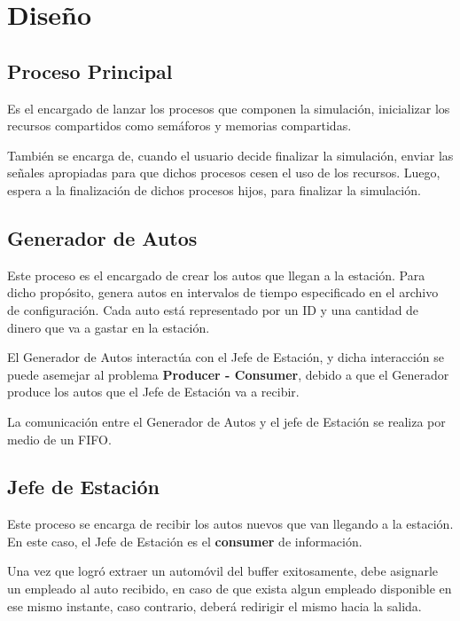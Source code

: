 \documentclass[12pt,a4paper,spanish]{article}
\begin{document}

\newpage
\tableofcontents
\newpage
\section{Diseño}
	\subsection{Proceso Principal}

		Es el encargado de lanzar los procesos que componen la simulación, inicializar los recursos
		compartidos como semáforos y memorias compartidas.

		También se encarga de, cuando el usuario decide finalizar la simulación, enviar las señales
		apropiadas para que dichos procesos cesen el uso de los recursos. Luego, espera a la finalización
		de dichos procesos hijos, para finalizar la simulación.

	\subsection{Generador de Autos}
		
		Este proceso es el encargado de crear los autos que llegan a la estación. Para
		dicho propósito, genera autos en intervalos de tiempo especificado en el archivo de configuración. 
		Cada auto está representado por un ID y una cantidad de dinero que va a gastar en la estación.

		El Generador de Autos interactúa con el Jefe de Estación, y dicha interacción se puede
		asemejar al problema \textbf{Producer - Consumer}, debido a que el Generador produce
		los autos que el Jefe de Estación va a recibir. 

		La comunicación entre el Generador de Autos y el jefe de Estación se realiza por medio de un
		FIFO.


	\subsection{Jefe de Estación}
		Este proceso se encarga de recibir los autos nuevos que van llegando a la estación. 
		En este caso, el Jefe de Estación es el \textbf{consumer} de información.

		Una vez que logró extraer un automóvil del buffer exitosamente, debe asignarle 
		un empleado al auto recibido, en caso de que exista algun empleado disponible 
		en ese mismo instante, caso contrario, deberá redirigir el mismo hacia la salida.
		
\end{document}
